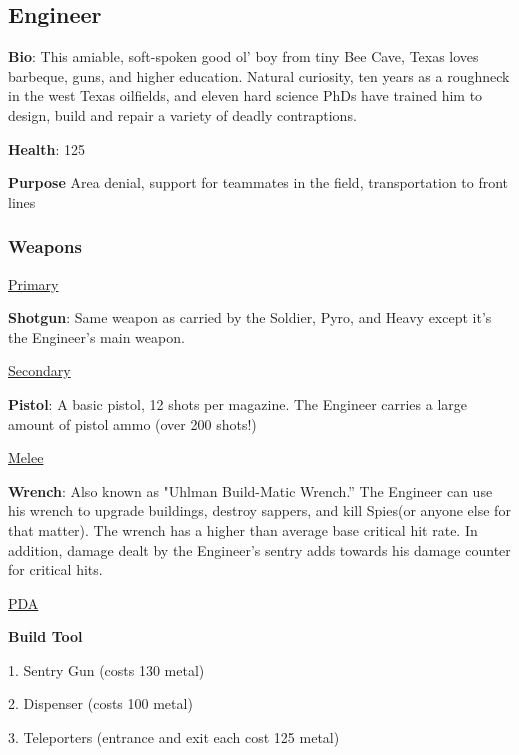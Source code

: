 \subsection{Engineer}
{\bf Bio}:
This amiable, soft-spoken good ol' boy from tiny Bee Cave, Texas loves barbeque, guns, and higher education. Natural curiosity, ten years as a roughneck in the west Texas oilfields, and eleven hard science PhDs have trained him to design, build and repair a variety of deadly contraptions.

{\bf Health}: 125

{\bf Purpose}
Area denial, support for teammates in the field, transportation to front lines

\subsubsection {Weapons}


\begin {center}
\underline {Primary}
\end {center}

{\bf Shotgun}: Same weapon as carried by the Soldier, Pyro, and Heavy except it's the Engineer's main weapon.


\begin {center}
\underline {Secondary}
\end {center}

{\bf Pistol}: A basic pistol, 12 shots per magazine. The Engineer carries a large amount of pistol ammo (over 200 shots!)


\begin {center}
\underline {Melee}
\end {center}

{\bf Wrench}: Also known as "Uhlman Build-Matic Wrench.” The Engineer can use his wrench to upgrade buildings, destroy sappers, and kill Spies(or anyone else for that matter). The wrench has a higher than average base critical hit rate.  In addition, damage dealt by the Engineer's sentry adds towards his damage counter for critical hits.


\begin {center}
\underline {PDA}
\end {center}
{\bf Build Tool}

1.       Sentry Gun (costs 130 metal)

2.       Dispenser (costs 100 metal)

3.       Teleporters (entrance and exit each cost 125 metal)


